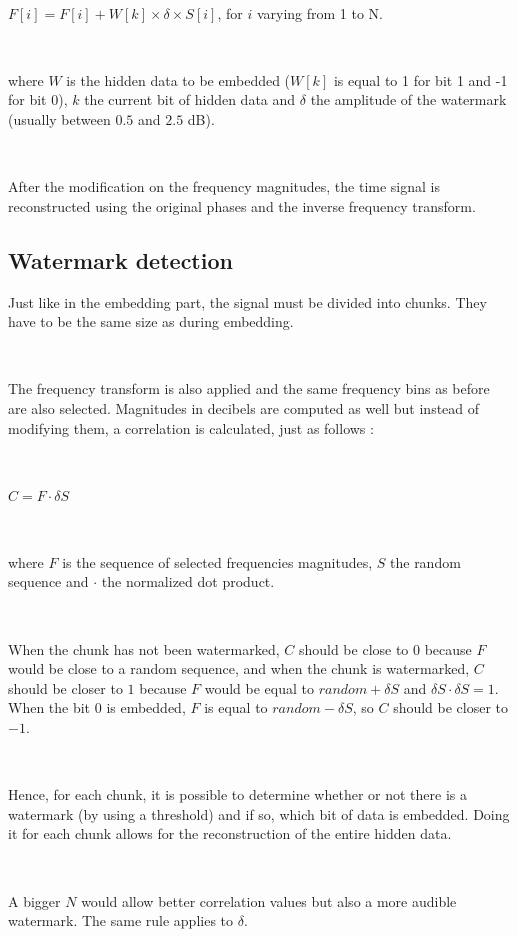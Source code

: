 ~

$F[i] = F[i] + W[k] \times \delta \times S[i]$, for $i$ varying from 1 to N.

~

\noindent where $W$ is the hidden data to be embedded ($W[k]$ is equal to 1 for bit 1 and -1 for bit 0), $k$ the current bit of hidden data and $\delta$ the amplitude of the watermark (usually between $0.5$ and $2.5$ dB).

~

After the modification on the frequency magnitudes, the time signal is reconstructed using the original phases and the inverse frequency transform.

\subsection{Watermark detection}

Just like in the embedding part, the signal must be divided into chunks. They have to be the same size as during embedding.

~

The frequency transform is also applied and the same frequency bins as before are also selected. Magnitudes in decibels are computed as well but instead of modifying them, a correlation is calculated, just as follows :

~

$C = F \cdot \delta S$

~

\noindent where $F$ is the sequence of selected frequencies magnitudes, $S$ the random sequence and $\cdot$ the normalized dot product.

~

When the chunk has not been watermarked, $C$ should be close to $0$ because $F$ would be close to a random sequence, and when the chunk is watermarked, $C$ should be closer to $1$ because $F$ would be equal to $random + \delta S$ and $\delta S \cdot \delta S = 1$. When the bit 0 is embedded, $F$ is equal to $random - \delta S$, so $C$ should be closer to $-1$.

~

Hence, for each chunk, it is possible to determine whether or not there is a watermark (by using a threshold) and if so, which bit of data is embedded. Doing it for each chunk allows for the reconstruction of the entire hidden data.

~

A bigger $N$ would allow better correlation values but also a more audible watermark. The same rule applies to $\delta$.

